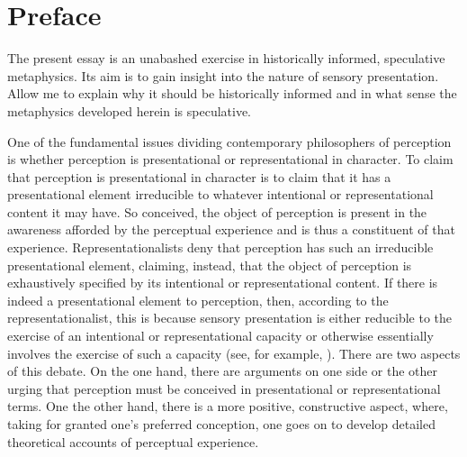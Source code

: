 \chapter*{Preface} %
\label{cha:preface}

The present essay is an unabashed exercise in historically informed, speculative metaphysics. Its aim is to gain insight into the nature of sensory presentation. Allow me to explain why it should be historically informed and in what sense the metaphysics developed herein is speculative.

One of the fundamental issues dividing contemporary philosophers of perception is whether perception is presentational or representational in character. To claim that perception is presentational in character is to claim that it has a presentational element irreducible to whatever intentional or representational content it may have. So conceived, the object of perception is present in the awareness afforded by the perceptual experience and is thus a constituent of that experience. Representationalists deny that perception has such an irreducible presentational element, claiming, instead, that the object of perception is exhaustively specified by its intentional or representational content. If there is indeed a presentational element to perception, then, according to the representationalist, this is because sensory presentation is either reducible to the exercise of an intentional or representational capacity or otherwise essentially involves the exercise of such a capacity (see, for example, \citealt{McDowell:2008fk,Searle:2015fu}). There are two aspects of this debate. On the one hand, there are arguments on one side or the other urging that perception must be conceived in presentational or representational terms. One the other hand, there is a more positive, constructive aspect, where, taking for granted one's preferred conception, one goes on to develop detailed theoretical accounts of perceptual experience. 

